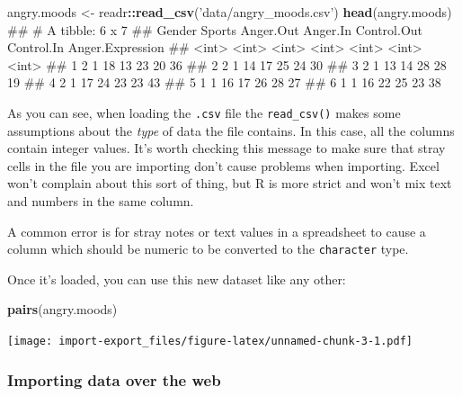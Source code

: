 \documentclass[]{article}
\newenvironment{Shaded}{\begin{snugshade}}{\end{snugshade}}
\newcommand{\KeywordTok}[1]{\textcolor[rgb]{0.13,0.29,0.53}{\textbf{#1}}}
\newcommand{\StringTok}[1]{\textcolor[rgb]{0.31,0.60,0.02}{#1}}
\newcommand{\OperatorTok}[1]{\textcolor[rgb]{0.81,0.36,0.00}{\textbf{#1}}}
\newcommand{\NormalTok}[1]{#1}
\theoremstyle{definition}
\theoremstyle{definition}
\theoremstyle{definition}
\theoremstyle{remark}
\begin{document}
\begin{Shaded}
\begin{Highlighting}[]
\NormalTok{angry.moods <-}\StringTok{ }\NormalTok{readr}\OperatorTok{::}\KeywordTok{read_csv}\NormalTok{(}\StringTok{'data/angry_moods.csv'}\NormalTok{)}
\KeywordTok{head}\NormalTok{(angry.moods)}
\NormalTok{## # A tibble: 6 x 7}
\NormalTok{##   Gender Sports Anger.Out Anger.In Control.Out Control.In Anger.Expression}
\NormalTok{##    <int>  <int>     <int>    <int>       <int>      <int>            <int>}
\NormalTok{## 1      2      1        18       13          23         20               36}
\NormalTok{## 2      2      1        14       17          25         24               30}
\NormalTok{## 3      2      1        13       14          28         28               19}
\NormalTok{## 4      2      1        17       24          23         23               43}
\NormalTok{## 5      1      1        16       17          26         28               27}
\NormalTok{## 6      1      1        16       22          25         23               38}
\end{Highlighting}
\end{Shaded}

As you can see, when loading the \texttt{.csv} file the
\texttt{read\_csv()} makes some assumptions about the \emph{type} of
data the file contains. In this case, all the columns contain integer
values. It's worth checking this message to make sure that stray cells
in the file you are importing don't cause problems when importing. Excel
won't complain about this sort of thing, but R is more strict and won't
mix text and numbers in the same column.

A common error is for stray notes or text values in a spreadsheet to
cause a column which should be numeric to be converted to the
\texttt{character} type.

Once it's loaded, you can use this new dataset like any other:

\begin{Shaded}
\begin{Highlighting}[]
\KeywordTok{pairs}\NormalTok{(angry.moods)}
\end{Highlighting}
\end{Shaded}

\texttt{[image: import-export\_files/figure-latex/unnamed-chunk-3-1.pdf]}

\subsubsection*{Importing data over the
web}\label{importing-data-from-the-web}
\end{document}
